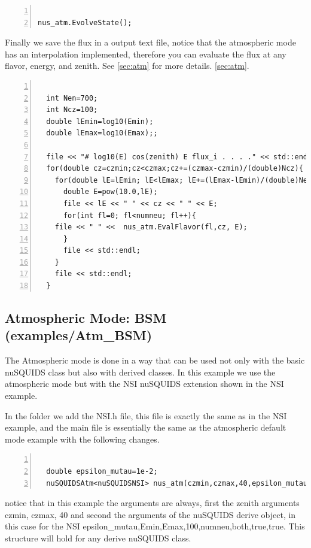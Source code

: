 \begin{lstlisting}[frame=leftline, numbers =
  left,breaklines=true,label = ex:sin1,firstnumber=last]

nus_atm.EvolveState();

\end{lstlisting}

Finally we save the flux in a output text file, notice that the
atmospheric mode has an interpolation implemented, therefore you can
evaluate the flux at any flavor, energy, and zenith. See \ref{sec:atm}
for more details.
\ref{sec:atm}.

\begin{lstlisting}[frame=leftline, numbers =
  left,breaklines=true,label = ex:sin1,firstnumber=last]

  int Nen=700;
  int Ncz=100;
  double lEmin=log10(Emin);
  double lEmax=log10(Emax);;

  file << "# log10(E) cos(zenith) E flux_i . . . ." << std::endl;
  for(double cz=czmin;cz<czmax;cz+=(czmax-czmin)/(double)Ncz){
    for(double lE=lEmin; lE<lEmax; lE+=(lEmax-lEmin)/(double)Nen){
      double E=pow(10.0,lE);
      file << lE << " " << cz << " " << E;
      for(int fl=0; fl<numneu; fl++){
	file << " " <<  nus_atm.EvalFlavor(fl,cz, E);
      }
      file << std::endl;
    }
    file << std::endl;
  }

\end{lstlisting}


\subsection{Atmospheric Mode: BSM \textnormal{({\ttf examples/Atm\_BSM})}}

The Atmospheric mode is done in a way that can be used not only with
the basic nuSQUIDS class but also with derived classes. In this
example we use the atmospheric mode but with the NSI nuSQUIDS
extension shown in the NSI example.

In the folder we add the {\ttf NSI.h} file, this file is exactly the
same as in the NSI example, and the main file is essentially the same as
the atmospheric default mode example with the following changes.

\begin{lstlisting}[frame=leftline, numbers =
  left,breaklines=true,label = ex:sin1,firstnumber=last]

  double epsilon_mutau=1e-2;
  nuSQUIDSAtm<nuSQUIDSNSI> nus_atm(czmin,czmax,40,epsilon_mutau,Emin,Emax,100,numneu,both,true,true);

\end{lstlisting}

notice that in this example the arguments are always, first the zenith
arguments {\ttf czmin, czmax, 40} and second the arguments of the
nuSQUIDS derive object, in this case for the NSI {\ttf
  epsilon\_mutau,Emin,Emax,100,numneu,both,true,true}. This structure
will hold for any derive nuSQUIDS class.


